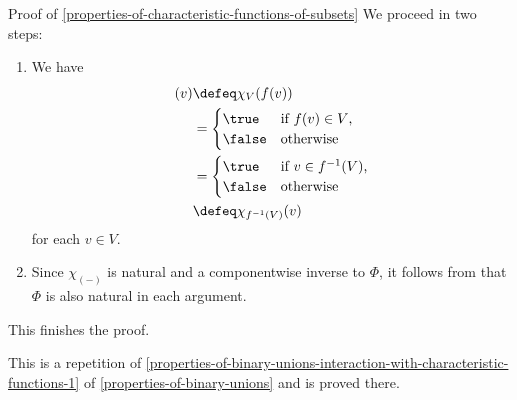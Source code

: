 \begin{Proof}{Proof of \cref{properties-of-characteristic-functions-of-subsets}}
    We proceed in two steps:
    \begin{enumerate}
        \item\label{proof-of-properties-of-characteristic-functions-of-subsets-naturality-1}We have
            \begin{align*}
                [\chi_{V}\circ f](v) &\defeq \chi_{V}(f(v))\\%
                                     &=      \begin{cases}
                                                 \true  &\text{if $f(v)\in V$,}\\
                                                 \false &\text{otherwise}
                                             \end{cases}\\
                                     &=      \begin{cases}
                                                 \true  &\text{if $v\in f^{-1}(V)$,}\\
                                                 \false &\text{otherwise}
                                             \end{cases}\\
                                     &\defeq \chi_{f^{-1}(V)}(v)%
            \end{align*}
            for each $v\in V$.
        \item\label{proof-of-properties-of-characteristic-functions-of-subsets-naturality-2}Since $\chi_{(-)}$ is natural and a componentwise inverse to $\Phi$, it follows from  that $\Phi$ is also natural in each argument.
    \end{enumerate}
    This finishes the proof.

    This is a repetition of \cref{properties-of-binary-unions-interaction-with-characteristic-functions-1} of \cref{properties-of-binary-unions} and is proved there.


\end{Proof}
